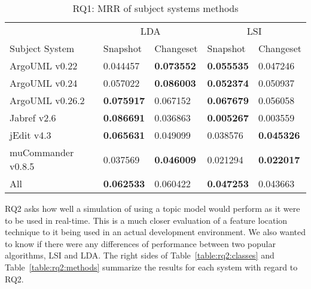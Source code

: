 \begin{table}[t]
\renewcommand{\arraystretch}{1.3}
\centering
\caption{RQ1: MRR of subject systems methods}
\begin{tabular}{l|ll|ll}
    \toprule
                         & \multicolumn{2}{c|}{LDA}      &  \multicolumn{2}{c}{LSI}  \\
    Subject System       & Snapshot      & Changeset      & Snapshot      & Changeset  \\
    \midrule
ArgoUML v0.22 & 0.044457 & {\bf 0.073552 } & {\bf 0.055535 } & 0.047246  \\
ArgoUML v0.24 & 0.057022 & {\bf 0.086003 } & {\bf 0.052374 } & 0.050937  \\
ArgoUML v0.26.2 & {\bf 0.075917 } & 0.067152 & {\bf 0.067679 } & 0.056058  \\
Jabref v2.6 & {\bf 0.086691 } & 0.036863 & {\bf 0.005267 } & 0.003559  \\
jEdit v4.3 & {\bf 0.065631 } & 0.049099 & 0.038576 & {\bf 0.045326 }  \\
muCommander v0.8.5 & 0.037569 & {\bf 0.046009 } & 0.021294 & {\bf 0.022017 }  \\
    \midrule
All & {\bf 0.062533 } & 0.060422 & {\bf 0.047253 } & 0.043663  \\
    \bottomrule
\end{tabular}
\label{table:rq1:methods}
\end{table}


RQ2 asks how well a simulation of using a topic model would perform as
it were to be used in real-time.
This is a much closer evaluation of a feature location technique to it
being used in an actual development environment.
We also wanted to know if there were any differences of performance
between two popular algorithms, LSI and LDA.
The right sides of Table~\ref{table:rq2:classes} and Table~\ref{table:rq2:methods}
summarize the results for each system with regard to RQ2.




